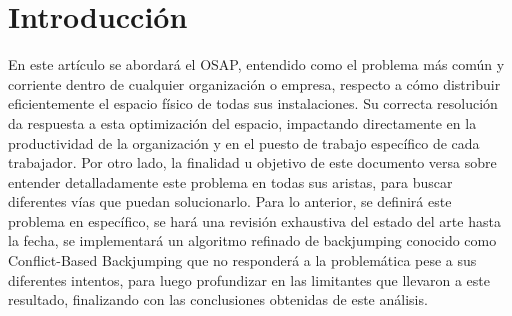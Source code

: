 \documentclass[letter, 10pt]{article}
\begin{document}
\begin{abstract}
En las grandes organizaciones existe el desaf\'io respecto a la distribuci\'on del espacio f\'isico de las oficinas, cub\'iculos, salas, entre otros, de la manera m\'as eficiente posible. Este reto es llamado \textit{Office Space Allocation Problem} (con sus siglas, OSAP), que consiste en asignar entidades (m\'aquinas, personas, roles, etc.) a un grupo de habitaciones disponibles, rigiend\'ose por diferentes tipos de restricciones para as\'i optimizar el uso del espacio. Este documento definir\'a el problema, a trav\'es de la revisi\'on de diferentes modelos existentes que se usan para resolver este tipo de obst\'aculos, para finalmente formular un algoritmo de backjumping, basado en una lista de conflictos (CBJ) que permita analizar c\'omo se desenvuelven las variables del sistema, con el objetivo de minimizar todo espacio que est\'e mal distribuido, es decir, el espacio que no se est\'e ocupando y el que se est\'e sobre utilizando.


\end{abstract}
\section{Introducci\'on}

En este art\'iculo se abordar\'a el OSAP, entendido como el problema m\'as com\'un y corriente dentro de cualquier organizaci\'on o empresa, respecto a c\'omo distribuir eficientemente el espacio f\'isico de todas sus instalaciones. Su correcta resoluci\'on da respuesta a esta optimizaci\'on del espacio, impactando directamente en la productividad de la organizaci\'on y en el puesto de trabajo espec\'ifico de cada trabajador. Por otro lado, la finalidad u objetivo de este documento versa sobre entender detalladamente este problema en todas sus aristas, para buscar diferentes v\'ias que puedan solucionarlo. Para lo anterior, se definir\'a este problema en espec\'ifico, se har\'a una revisi\'on exhaustiva del estado del arte hasta la fecha, se implementar\'a un algoritmo refinado de backjumping conocido como Conflict-Based Backjumping que no responder\'a a la problem\'atica pese a sus diferentes intentos, para luego profundizar en las limitantes que llevaron a este resultado, finalizando con las conclusiones obtenidas de este an\'alisis.


\end{document}
